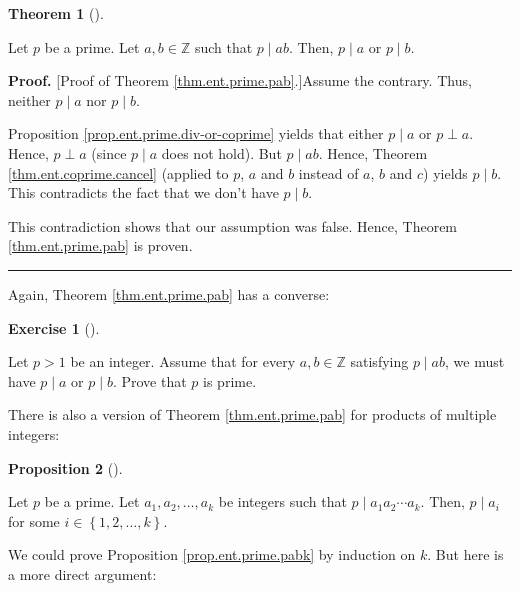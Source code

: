 \documentclass[numbers=enddot,12pt,final,onecolumn,notitlepage]{scrartcl}%
\newcounter{exer}
\numberwithin{exer}{subsection}
\theoremstyle{definition}
\newtheorem{theo}{Theorem}[subsection]
\newenvironment{theorem}[1][]
{\begin{theo}[#1]\begin{leftbar}}
{\end{leftbar}\end{theo}}
\newtheorem{prop}[theo]{Proposition}
\newenvironment{proposition}[1][]
{\begin{prop}[#1]\begin{leftbar}}
{\end{leftbar}\end{prop}}
\newtheorem{exmp}[exer]{Exercise}
\newenvironment{exercise}[1][]
{\begin{exmp}[#1]\begin{leftbar}}
{\end{leftbar}\end{exmp}}
\newenvironment{proof}[1][Proof]{\noindent\textbf{#1.} }{\ \rule{0.5em}{0.5em}}
\begin{document}
\begin{theorem}
\label{thm.ent.prime.pab}Let $p$ be a prime. Let $a,b\in\mathbb{Z}$ such that
$p\mid ab$. Then, $p\mid a$ or $p\mid b$.
\end{theorem}

\begin{proof}
[Proof of Theorem \ref{thm.ent.prime.pab}.]Assume the contrary. Thus, neither
$p\mid a$ nor $p\mid b$.

Proposition \ref{prop.ent.prime.div-or-coprime} yields that either $p\mid a$
or $p\perp a$. Hence, $p\perp a$ (since $p\mid a$ does not hold). But $p\mid
ab$. Hence, Theorem \ref{thm.ent.coprime.cancel} (applied to $p$, $a$ and $b$
instead of $a$, $b$ and $c$) yields $p\mid b$. This contradicts the fact that
we don't have $p\mid b$.

This contradiction shows that our assumption was false. Hence, Theorem
\ref{thm.ent.prime.pab} is proven.
\end{proof}

Again, Theorem \ref{thm.ent.prime.pab} has a converse:

\begin{exercise}
\label{exe.ent.prime.pab-conv}Let $p>1$ be an integer. Assume that for every
$a,b\in\mathbb{Z}$ satisfying $p\mid ab$, we must have $p\mid a$ or $p\mid b$.
Prove that $p$ is prime.
\end{exercise}

There is also a version of Theorem \ref{thm.ent.prime.pab} for products of
multiple integers:

\begin{proposition}
\label{prop.ent.prime.pabk}Let $p$ be a prime. Let $a_{1},a_{2},\ldots,a_{k}$
be integers such that $p\mid a_{1}a_{2}\cdots a_{k}$. Then, $p\mid a_{i}$ for
some $i\in\left\{  1,2,\ldots,k\right\}  $.
\end{proposition}

We could prove Proposition \ref{prop.ent.prime.pabk} by induction on $k$. But
here is a more direct argument:
\end{document}

